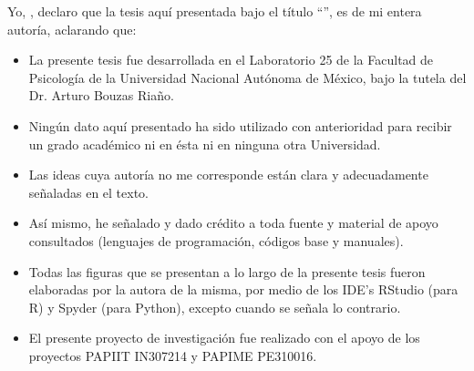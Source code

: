 \documentclass[
12pt, %
spanish, %
onehalfspacing, %
headsepline, %
]{MastersDoctoralThesis} %
\begin{document}
\begin{declaration}
\addchaptertocentry{\authorshipname} %
\noindent Yo, \authorname, declaro que la tesis aquí presentada bajo el título \enquote{\ttitle}, es de mi entera autoría, aclarando que:\\

\begin{itemize} 
\item La presente tesis fue desarrollada en el Laboratorio 25 de la Facultad de Psicología de la Universidad Nacional Autónoma de México, bajo la tutela del Dr. Arturo Bouzas Riaño. 
\item Ningún dato aquí presentado ha sido utilizado con anterioridad para recibir un grado académico ni en ésta ni en ninguna otra Universidad. 
\item Las ideas cuya autoría no me corresponde están clara y adecuadamente señaladas en el texto. 
\item Así mismo, he señalado y dado crédito a toda fuente y material de apoyo consultados (lenguajes de programación, códigos base y manuales).
\item Todas las figuras que se presentan a lo largo de la presente tesis fueron elaboradas por la autora de la misma, por medio de los IDE's RStudio (para R) y Spyder (para Python), excepto cuando se señala lo contrario.
\item El presente proyecto de investigación fue realizado con el apoyo de los proyectos PAPIIT IN307214 y PAPIME PE310016.\\
\end{itemize}
 
 
\end{declaration}

\cleardoublepage

\end{document}
